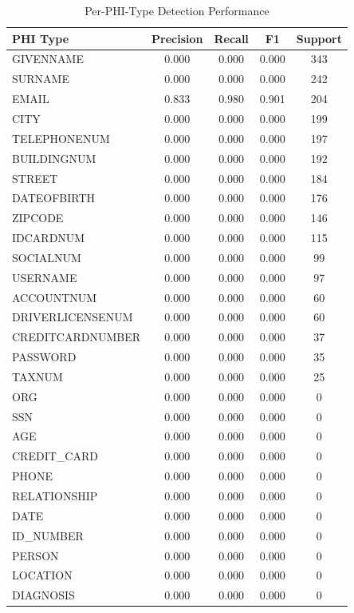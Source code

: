 
\begin{table}[h]
\centering
\caption{Per-PHI-Type Detection Performance}
\label{tab:per_type}
\begin{tabular}{lcccc}
\hline
\textbf{PHI Type} & \textbf{Precision} & \textbf{Recall} & \textbf{F1} & \textbf{Support} \\
\hline
GIVENNAME & 0.000 & 0.000 & 0.000 & 343 \\
SURNAME & 0.000 & 0.000 & 0.000 & 242 \\
EMAIL & 0.833 & 0.980 & 0.901 & 204 \\
CITY & 0.000 & 0.000 & 0.000 & 199 \\
TELEPHONENUM & 0.000 & 0.000 & 0.000 & 197 \\
BUILDINGNUM & 0.000 & 0.000 & 0.000 & 192 \\
STREET & 0.000 & 0.000 & 0.000 & 184 \\
DATEOFBIRTH & 0.000 & 0.000 & 0.000 & 176 \\
ZIPCODE & 0.000 & 0.000 & 0.000 & 146 \\
IDCARDNUM & 0.000 & 0.000 & 0.000 & 115 \\
SOCIALNUM & 0.000 & 0.000 & 0.000 & 99 \\
USERNAME & 0.000 & 0.000 & 0.000 & 97 \\
ACCOUNTNUM & 0.000 & 0.000 & 0.000 & 60 \\
DRIVERLICENSENUM & 0.000 & 0.000 & 0.000 & 60 \\
CREDITCARDNUMBER & 0.000 & 0.000 & 0.000 & 37 \\
PASSWORD & 0.000 & 0.000 & 0.000 & 35 \\
TAXNUM & 0.000 & 0.000 & 0.000 & 25 \\
ORG & 0.000 & 0.000 & 0.000 & 0 \\
SSN & 0.000 & 0.000 & 0.000 & 0 \\
AGE & 0.000 & 0.000 & 0.000 & 0 \\
CREDIT_CARD & 0.000 & 0.000 & 0.000 & 0 \\
PHONE & 0.000 & 0.000 & 0.000 & 0 \\
RELATIONSHIP & 0.000 & 0.000 & 0.000 & 0 \\
DATE & 0.000 & 0.000 & 0.000 & 0 \\
ID_NUMBER & 0.000 & 0.000 & 0.000 & 0 \\
PERSON & 0.000 & 0.000 & 0.000 & 0 \\
LOCATION & 0.000 & 0.000 & 0.000 & 0 \\
DIAGNOSIS & 0.000 & 0.000 & 0.000 & 0 \\
\hline
\end{tabular}
\end{table}
